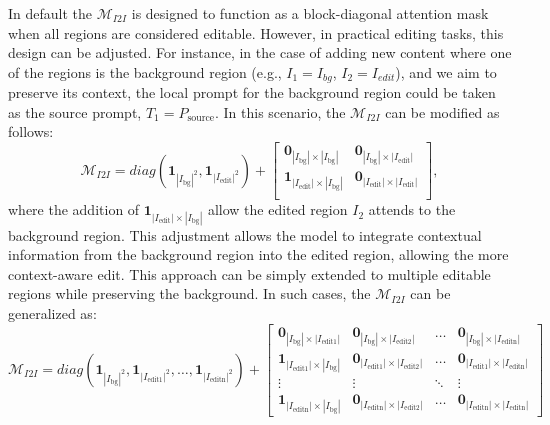 \documentclass{article}
\begin{document}
In default the $\mathcal{M}_{I2I}$ is designed to function as a block-diagonal attention mask when all regions are considered editable. However, in practical editing tasks, this design can be adjusted. For instance, in the case of adding new content where one of the regions is the background region (e.g., $I_1=I_{bg}$, $I_2=I_{edit}$), and we aim to preserve its context, the local prompt for the background region could be taken as the source prompt, $T_1=P_\text{source}$. In this scenario, the $\mathcal{M}_{I2I}$ can be modified as follows:
\begin{equation*}
    \mathcal{M}_{I2I} = diag(\mathbf{1}_{|I_\text{bg}|^2}, \mathbf{1}_{|I_\text{edit}|^2})+ \begin{bmatrix}
        \mathbf{0}_{|I_\text{bg}|\times|I_\text{bg}|} &  \mathbf{0}_{|I_\text{bg}|\times|I_\text{edit}|}\\
        \mathbf{1}_{|I_\text{edit}|\times|I_\text{bg}|} &  \mathbf{0}_{|I_\text{edit}|\times|I_\text{edit}|}\\
    \end{bmatrix},
\end{equation*}
where the addition of $\mathbf{1}_{|I_\text{edit}|\times|I_\text{bg}|}$ allow the edited region $I_2$ attends to the background region. This adjustment allows the model to integrate contextual information from the background region into the edited region, allowing the more context-aware edit. This approach can be simply extended to multiple editable regions while preserving the background. In such cases, the $\mathcal{M}_{I2I}$ can be generalized as:
\begin{equation*}
\mathcal{M}_{I2I} = {diag}(\mathbf{1}_{|I_\text{bg}|^2}, \mathbf{1}_{|I_{\text{edit1}}|^2}, \dots, \mathbf{1}_{|I_{\text{editn}}|^2}) + \begin{bmatrix}
\mathbf{0}_{|I_\text{bg}|\times|I_\text{edit1}|} & \mathbf{0}_{|I_\text{bg}|\times|I_\text{edit2}|} & \dots & \mathbf{0}_{|I_\text{bg}|\times|I_\text{editn}|} \\
\mathbf{1}_{|I_\text{edit1}|\times|I_\text{bg}|} & \mathbf{0}_{|I_\text{edit1}|\times|I_\text{edit2}|} & \dots & \mathbf{0}_{|I_\text{edit1}|\times|I_\text{editn}|} \\
\vdots & \vdots & \ddots & \vdots \\
\mathbf{1}_{|I_\text{editn}|\times|I_\text{bg}|} & \mathbf{0}_{|I_\text{editn}|\times|I_\text{edit2}|} & \dots & \mathbf{0}_{|I_\text{editn}|\times|I_\text{editn}|}
\end{bmatrix}
\end{equation*}
\end{document}
